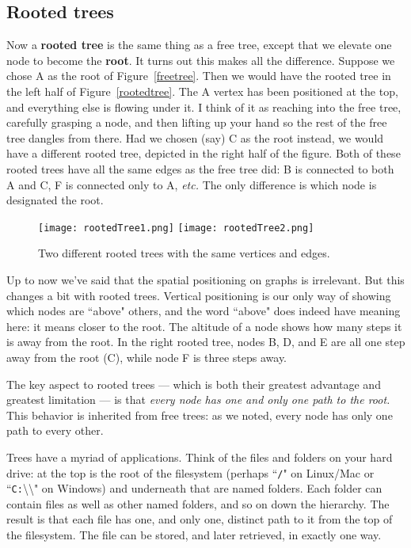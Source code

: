 \subsection{Rooted trees}

Now a \textbf{rooted tree} is the same thing as a free tree, except that we
elevate one node to become the \textbf{root}. It turns out this makes all
the difference. Suppose we chose A as the root of Figure~\ref{freetree}.
Then we would have the rooted tree in the left half of
Figure~\ref{rootedtree}. The A vertex has been positioned at the top, and
everything else is flowing under it. I think of it as reaching into the
free tree, carefully grasping a node, and then lifting up your hand so the
rest of the free tree dangles from there. Had we chosen (say) C as the root
instead, we would have a different rooted tree, depicted in the right half
of the figure. Both of these rooted trees have all the same edges as the
free tree did: B is connected to both A and C, F is connected only to A,
\textit{etc.} The only difference is which node is designated the root.

\begin{figure}[ht]
\centering
\begin{custommargins}{-2.1cm}{-3cm}
\texttt{[image: rootedTree1.png]} \quad\quad\quad
\texttt{[image: rootedTree2.png]}
\caption{Two different rooted trees with the same vertices and edges.}
\label{rootedtree}
\end{custommargins}
\label{page:rootedtree}
\end{figure}

Up to now we've said that the spatial positioning on graphs is irrelevant.
But this changes a bit with rooted trees. Vertical positioning is our only
way of showing which nodes are ``above" others, and the word ``above" does
indeed have meaning here: it means closer to the root. The altitude of a
node shows how many steps it is away from the root. In the right rooted
tree, nodes B, D, and E are all one step away from the root (C), while node
F is three steps away.

The key aspect to rooted trees --- which is both their greatest advantage
and greatest limitation --- is that \textit{every node has one and only one
path to the root.} This behavior is inherited from free trees: as we noted,
every node has only one path to every other.

Trees have a myriad of applications. Think of the files and folders on your
hard drive: at the top is the root of the filesystem (perhaps ``\texttt{/}"
on Linux/Mac or ``\texttt{C:}\textbackslash\textbackslash" on Windows) and
underneath that are named folders. Each folder can contain files as well as
other named folders, and so on down the hierarchy. The result is that each
file has one, and only one, distinct path to it from the top of the
filesystem.  The file can be stored, and later retrieved, in exactly one
way.

